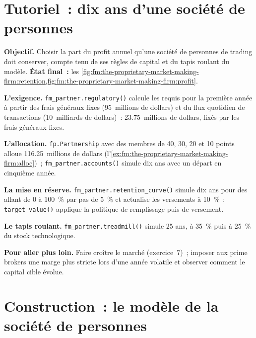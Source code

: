 \section{Tutoriel~: dix ans d'une société de personnes}\label{tut:fm:the-proprietary-market-making-firm:tut}

\begin{tutorial}
\textbf{Objectif.} Choisir la part du profit annuel qu'une société de personnes de trading doit conserver, compte tenu de ses règles de capital et du tapis roulant du modèle.
\textbf{État final~:} les \cref{fig:fm:the-proprietary-market-making-firm:retention,fig:fm:the-proprietary-market-making-firm:profit}.
\begin{tutsteps}
\item \textbf{L'exigence.} \texttt{fm\_partner.regulatory()} calcule les  requis pour la première année à partir des frais généraux fixes (95~millions de dollars) et
du flux quotidien de transactions (10~milliards de dollars)~: 23.75~millions de dollars, fixés par les frais généraux fixes.
\item \textbf{L'allocation.} \texttt{fp.Partnership} avec des membres de 40, 30, 20 et 10 points alloue 116.25~millions de dollars
(l'\cref{ex:fm:the-proprietary-market-making-firm:alloc})~; \texttt{fm\_partner.accounts()} simule dix ans avec un départ en cinquième année.
\item \textbf{La mise en réserve.} \texttt{fm\_partner.retention\_curve()} simule dix ans pour des  allant de 0 à 100~\% par pas de 5~\% et
actualise les versements à 10~\%~; \texttt{target\_value()} applique la politique de remplissage puis de versement.
\item \textbf{Le tapis roulant.} \texttt{fm\_partner.treadmill()} simule 25 ans, à 35~\% puis à 25~\% du stock technologique.
\end{tutsteps}
\end{tutorial}

\textbf{Pour aller plus loin.} Faire croître le marché (exercice~7)~; imposer aux prime brokers une marge plus stricte lors d'une année volatile et observer comment le
capital cible évolue.

\section{Construction~: le modèle de la société de personnes}\label{bld:fm:the-proprietary-market-making-firm:partnership}

